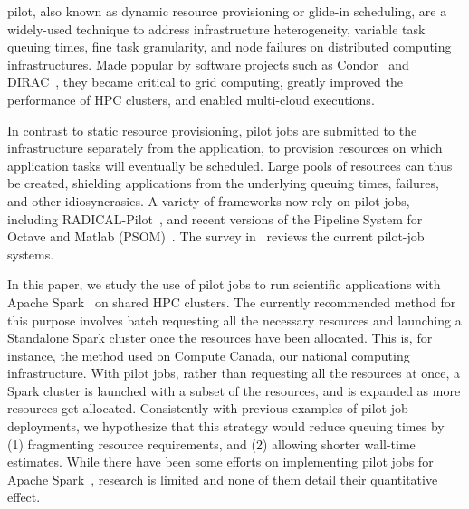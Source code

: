     \Gls{pilot}, also known as dynamic resource provisioning or glide-in
    scheduling, are a widely-used technique to address infrastructure
    heterogeneity, variable task queuing times, fine task granularity, and node
    failures on distributed computing infrastructures. Made popular by software
    projects such as Condor~\cite{thain2005distributed} and
    DIRAC~\cite{casajus2010dirac}, they became critical to grid computing,
    greatly improved the performance of HPC clusters, and enabled multi-cloud
    executions. 
    
    In contrast to static resource provisioning, pilot jobs are submitted to the
    infrastructure separately from the application, to provision resources on
    which application tasks will eventually be scheduled. Large pools of
    resources can thus be created, shielding applications from the underlying
    queuing times, failures, and other idiosyncrasies. A variety of frameworks
    now rely on pilot jobs, including RADICAL-Pilot~\cite{merzky2015radical},
    and recent versions of the Pipeline System for Octave and Matlab
    (PSOM)~\cite{bellec2012pipeline}. The survey
    in~\cite{turilli2018comprehensive} reviews the current pilot-job systems.
    
    In this paper, we study the use of pilot jobs to run scientific applications
    with Apache Spark~\cite{zaharia2016apache} on shared HPC clusters. The
    currently recommended method for this purpose involves batch requesting all
    the necessary resources and launching a Standalone Spark cluster once the
    resources have been allocated. This is, for instance, the method used on
    Compute Canada, our national computing infrastructure. With pilot jobs,
    rather than requesting all the resources at once, a Spark cluster is
    launched with a subset of the resources, and is expanded as more resources
    get allocated. Consistently with previous examples of pilot job deployments,
    we hypothesize that this strategy would reduce queuing times by (1)
    fragmenting resource requirements, and (2) allowing shorter wall-time
    estimates. While there have been some efforts on implementing pilot jobs for
    Apache Spark~\cite{luckow2016hadoop}, research is limited and none of them
    detail their quantitative effect.
    
